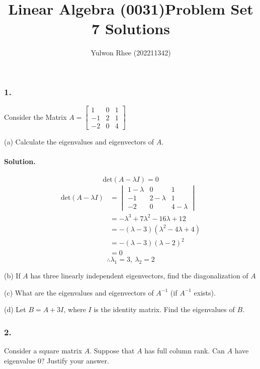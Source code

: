 



\title{Linear Algebra (0031)\newline\space Problem Set 7 Solutions}
\author{Yulwon Rhee (202211342)}

\maketitle
\subsubsection{1.} Consider the Matrix $A = \begin{bmatrix}
    1&0&1\\
    -1&2&1\\
    -2&0&4
\end{bmatrix}$

(a) Calculate the eigenvalues and eigenvectors of $A$.
\paragraph*{Solution.}
$$\mathrm{det}(A-\lambda I) = 0$$
\begin{align*}
    \mathrm{det}(A-\lambda I) &= \begin{vmatrix}
        1-\lambda&0&1\\
        -1&2-\lambda&1\\
        -2&0&4-\lambda
    \end{vmatrix}\\
    &= -\lambda^3 + 7\lambda^2-16\lambda+12\\
    &= -(\lambda - 3)(\lambda^2 -4\lambda + 4)\\
    &= -(\lambda - 3)(\lambda - 2)^2\\
    &= 0
\end{align*}
$$\therefore \lambda_1 = 3,\ \lambda_2 = 2$$

(b) If $A$ has three linearly independent eigenvectors, find the diagonalization of $A$

(c) What are the eigenvalues and eigenvectors of $A^{-1}$ (if $A^{-1}$ exists).

(d) Let $B = A + 3I$, where $I$ is the identity matrix. Find the eigenvalues of $B$.

\subsubsection{2.} Consider a square matrix $A$. Suppose that $A$ has full column rank. Can $A$ have eigenvalue $0$? Justify your answer.

